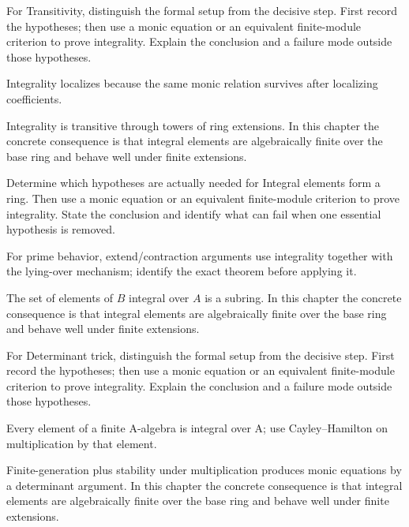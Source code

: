 \begin{exercise}\label{exr:v19-05}
For Transitivity, distinguish the formal setup from the decisive step. First record the hypotheses; then use a monic equation or an equivalent finite-module criterion to prove integrality. Explain the conclusion and a failure mode outside those hypotheses.
\end{exercise}
\begin{hint}
Integrality localizes because the same monic relation survives after localizing coefficients.
\end{hint}
\begin{solution}
Integrality is transitive through towers of ring extensions. In this chapter the concrete consequence is that integral elements are algebraically finite over the base ring and behave well under finite extensions.
\end{solution}

\begin{exercise}\label{exr:v19-06}
Determine which hypotheses are actually needed for Integral elements form a ring. Then use a monic equation or an equivalent finite-module criterion to prove integrality. State the conclusion and identify what can fail when one essential hypothesis is removed.
\end{exercise}
\begin{hint}
For prime behavior, extend/contraction arguments use integrality together with the lying-over mechanism; identify the exact theorem before applying it.
\end{hint}
\begin{solution}
The set of elements of $B$ integral over $A$ is a subring. In this chapter the concrete consequence is that integral elements are algebraically finite over the base ring and behave well under finite extensions.
\end{solution}

\begin{exercise}\label{exr:v19-07}
For Determinant trick, distinguish the formal setup from the decisive step. First record the hypotheses; then use a monic equation or an equivalent finite-module criterion to prove integrality. Explain the conclusion and a failure mode outside those hypotheses.
\end{exercise}
\begin{hint}
Every element of a finite A-algebra is integral over A; use Cayley--Hamilton on multiplication by that element.
\end{hint}
\begin{solution}
Finite-generation plus stability under multiplication produces monic equations by a determinant argument. In this chapter the concrete consequence is that integral elements are algebraically finite over the base ring and behave well under finite extensions.
\end{solution}

